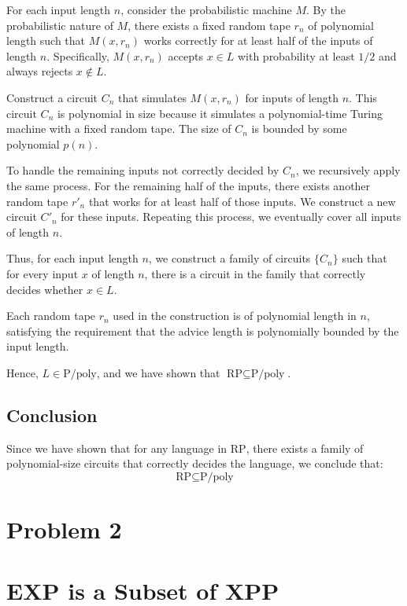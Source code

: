 \documentclass{article}
\begin{document}
For each input length \(n\), consider the probabilistic machine \(M\). By the probabilistic nature of \(M\), there exists a fixed random tape \(r_n\) of polynomial length such that \(M(x, r_n)\) works correctly for at least half of the inputs of length \(n\). Specifically, \(M(x, r_n)\) accepts \(x \in L\) with probability at least \(1/2\) and always rejects \(x \notin L\).

Construct a circuit \(C_n\) that simulates \(M(x, r_n)\) for inputs of length \(n\). This circuit \(C_n\) is polynomial in size because it simulates a polynomial-time Turing machine with a fixed random tape. The size of \(C_n\) is bounded by some polynomial \(p(n)\).

To handle the remaining inputs not correctly decided by \(C_n\), we recursively apply the same process. For the remaining half of the inputs, there exists another random tape \(r'_n\) that works for at least half of those inputs. We construct a new circuit \(C'_n\) for these inputs. Repeating this process, we eventually cover all inputs of length \(n\).

Thus, for each input length \(n\), we construct a family of circuits \(\{C_n\}\) such that for every input \(x\) of length \(n\), there is a circuit in the family that correctly decides whether \(x \in L\).

Each random tape \(r_n\) used in the construction is of polynomial length in \(n\), satisfying the requirement that the advice length is polynomially bounded by the input length.

Hence, \(L \in \text{P/poly}\), and we have shown that \(\text{RP} \subseteq \text{P/poly}\).


    

\subsection*{Conclusion}
Since we have shown that for any language in \(\text{RP}\), there exists a family of polynomial-size circuits that correctly decides the language, we conclude that:
\[
\text{RP} \subseteq \text{P/poly}
\]
\pagebreak
\section{Problem 2}
\section*{EXP is a Subset of XPP}
\end{document}
